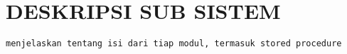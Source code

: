 \chapter{DESKRIPSI SUB SISTEM}

\begin{verbatim}
menjelaskan tentang isi dari tiap modul, termasuk stored procedure
\end{verbatim}